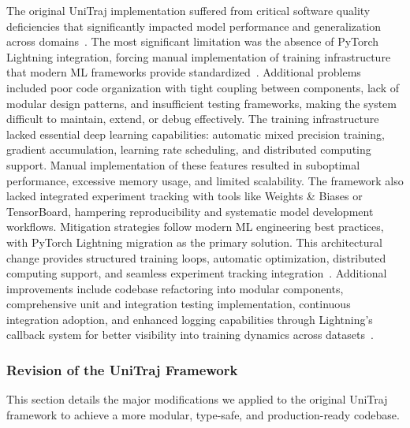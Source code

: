 The original UniTraj implementation suffered from critical software quality deficiencies that significantly impacted model performance and generalization across domains~\cite{metadriveLi2022}. The most significant limitation was the absence of PyTorch Lightning integration, forcing manual implementation of training infrastructure that modern ML frameworks provide standardized~\cite{falcon2019pytorch}. Additional problems included poor code organization with tight coupling between components, lack of modular design patterns, and insufficient testing frameworks, making the system difficult to maintain, extend, or debug effectively.
The training infrastructure lacked essential deep learning capabilities: automatic mixed precision training, gradient accumulation, learning rate scheduling, and distributed computing support. Manual implementation of these features resulted in suboptimal performance, excessive memory usage, and limited scalability. The framework also lacked integrated experiment tracking with tools like Weights \& Biases or TensorBoard, hampering reproducibility and systematic model development workflows.
Mitigation strategies follow modern ML engineering best practices, with PyTorch Lightning migration as the primary solution. This architectural change provides structured training loops, automatic optimization, distributed computing support, and seamless experiment tracking integration~\cite{falcon2019pytorch}. Additional improvements include codebase refactoring into modular components, comprehensive unit and integration testing implementation, continuous integration adoption, and enhanced logging capabilities through Lightning's callback system for better visibility into training dynamics across datasets~\cite{unitrajFeng2024, scenarionetLi2023}.


\subsubsection{Revision of the UniTraj Framework}
This section details the major modifications we applied to the original UniTraj framework to achieve a more modular, type-safe, and production-ready codebase.

